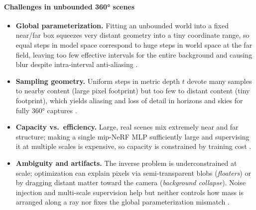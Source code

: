 \begin{enrichment}
\begin{enrichment}
        \paragraph{Challenges in unbounded 360° scenes}
        \begin{itemize}
            \item \textbf{Global parameterization.} Fitting an unbounded world into a fixed near/far box squeezes very distant geometry into a tiny coordinate range, so equal steps in model space correspond to huge steps in world space at the far field, leaving too few effective intervals for the entire background and causing blur despite intra-interval anti-aliasing \cite{barron2021_mipnerf,barron2022_mipnerf360}.
            \item \textbf{Sampling geometry.} Uniform steps in metric depth \(t\) devote many samples to nearby content (large pixel footprint) but too few to distant content (tiny footprint), which yields aliasing and loss of detail in horizons and skies for fully 360° captures \cite{barron2022_mipnerf360}.
            \item \textbf{Capacity vs.\ efficiency.} Large, real scenes mix extremely near and far structure; making a single mip-NeRF MLP sufficiently large and supervising it at multiple scales is expensive, so capacity is constrained by training cost \cite{barron2021_mipnerf}.
            \item \textbf{Ambiguity and artifacts.} The inverse problem is underconstrained at scale; optimization can explain pixels via semi-transparent blobs (\emph{floaters}) or by dragging distant matter toward the camera (\emph{background collapse}). Noise injection and multi-scale supervision help but neither controls how mass is arranged along a ray nor fixes the global parameterization mismatch \cite{mildenhall2020_nerf,barron2021_mipnerf}.
        \end{itemize}
        
        \newpage
        

\end{enrichment}
\end{enrichment}
